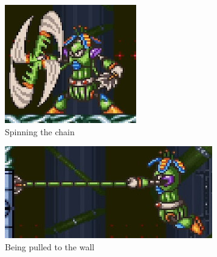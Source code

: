 \begin{figure}[htp]
	\centering
	\begin{subfigure}{0.4\linewidth}
		\centering
		\includegraphics[width=\linewidth]{figures/X2/Wire_sponge/Sponge_spin.png}
		\caption{Spinning the chain}
	\end{subfigure}
	\begin{subfigure}{0.5\linewidth}
		\centering
		\includegraphics[width=\linewidth]{figures/X2/Wire_sponge/Sponge_pull.jpg}
		\caption{Being pulled to the wall}
	\end{subfigure}
	\begin{subfigure}{0.4\linewidth}
		\centering

\end{subfigure}
\end{figure}
